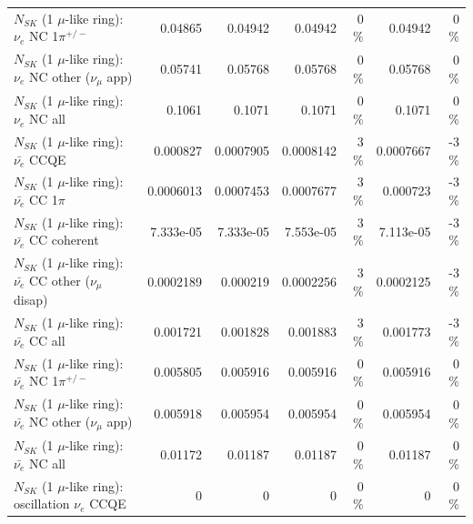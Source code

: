 \begin{table}
\begin{tabular}{| l | r | r | r  r | r  r |}
\hline
                           $N_{SK}$ (1 $\mu$-like ring): $\nu_e$ NC 1$\pi^{+/-}$ &         0.04865 &         0.04942 &         0.04942 &        0 \%  &         0.04942 &        0 \%  \\ 
                  $N_{SK}$ (1 $\mu$-like ring): $\nu_e$ NC other ($\nu_\mu$ app) &         0.05741 &         0.05768 &         0.05768 &        0 \%  &         0.05768 &        0 \%  \\ 
                                  $N_{SK}$ (1 $\mu$-like ring): $\nu_{e}$ NC all &          0.1061 &          0.1071 &          0.1071 &        0 \%  &          0.1071 &        0 \%  \\ 
\hline
\hline
\hline
                                $N_{SK}$ (1 $\mu$-like ring): $\bar{\nu_e}$ CCQE &        0.000827 &       0.0007905 &       0.0008142 &        3 \%  &       0.0007667 &       -3 \%  \\ 
                           $N_{SK}$ (1 $\mu$-like ring): $\bar{\nu_e}$ CC 1$\pi$ &       0.0006013 &       0.0007453 &       0.0007677 &        3 \%  &        0.000723 &       -3 \%  \\ 
                         $N_{SK}$ (1 $\mu$-like ring): $\bar{\nu_e}$ CC coherent &       7.333e-05 &       7.333e-05 &       7.553e-05 &        3 \%  &       7.113e-05 &       -3 \%  \\ 
          $N_{SK}$ (1 $\mu$-like ring): $\bar{\nu_e}$ CC other ($\nu_\mu$ disap) &       0.0002189 &        0.000219 &       0.0002256 &        3 \%  &       0.0002125 &       -3 \%  \\ 
                            $N_{SK}$ (1 $\mu$-like ring): $\bar{\nu_{e}}$ CC all &        0.001721 &        0.001828 &        0.001883 &        3 \%  &        0.001773 &       -3 \%  \\ 
\hline
                     $N_{SK}$ (1 $\mu$-like ring): $\bar{\nu_e}$ NC 1$\pi^{+/-}$ &        0.005805 &        0.005916 &        0.005916 &        0 \%  &        0.005916 &        0 \%  \\ 
            $N_{SK}$ (1 $\mu$-like ring): $\bar{\nu_e}$ NC other ($\nu_\mu$ app) &        0.005918 &        0.005954 &        0.005954 &        0 \%  &        0.005954 &        0 \%  \\ 
                            $N_{SK}$ (1 $\mu$-like ring): $\bar{\nu_{e}}$ NC all &         0.01172 &         0.01187 &         0.01187 &        0 \%  &         0.01187 &        0 \%  \\ 
\hline
\hline
\hline
                          $N_{SK}$ (1 $\mu$-like ring): oscillation $\nu_e$ CCQE &               0 &               0 &               0 &        0 \%  &               0 &        0 \%  \\ 

\end{tabular}
\end{table}
